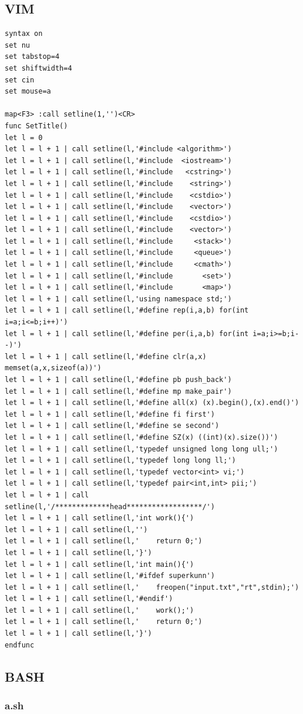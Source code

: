 \documentclass[twoside]{article}
\begin{document}
\subsection{VIM}
\begin{lstlisting}
syntax on
set nu
set tabstop=4
set shiftwidth=4
set cin
set mouse=a

map<F3> :call setline(1,'')<CR>
func SetTitle()
let l = 0
let l = l + 1 | call setline(l,'#include <algorithm>')
let l = l + 1 | call setline(l,'#include  <iostream>')
let l = l + 1 | call setline(l,'#include   <cstring>')
let l = l + 1 | call setline(l,'#include    <string>')
let l = l + 1 | call setline(l,'#include    <cstdio>')
let l = l + 1 | call setline(l,'#include    <vector>')
let l = l + 1 | call setline(l,'#include    <cstdio>')
let l = l + 1 | call setline(l,'#include    <vector>')
let l = l + 1 | call setline(l,'#include     <stack>')
let l = l + 1 | call setline(l,'#include     <queue>')
let l = l + 1 | call setline(l,'#include     <cmath>')
let l = l + 1 | call setline(l,'#include       <set>')
let l = l + 1 | call setline(l,'#include       <map>')
let l = l + 1 | call setline(l,'using namespace std;')
let l = l + 1 | call setline(l,'#define rep(i,a,b) for(int i=a;i<=b;i++)')
let l = l + 1 | call setline(l,'#define per(i,a,b) for(int i=a;i>=b;i--)')
let l = l + 1 | call setline(l,'#define clr(a,x) memset(a,x,sizeof(a))')
let l = l + 1 | call setline(l,'#define pb push_back')
let l = l + 1 | call setline(l,'#define mp make_pair')
let l = l + 1 | call setline(l,'#define all(x) (x).begin(),(x).end()')
let l = l + 1 | call setline(l,'#define fi first')
let l = l + 1 | call setline(l,'#define se second')
let l = l + 1 | call setline(l,'#define SZ(x) ((int)(x).size())')
let l = l + 1 | call setline(l,'typedef unsigned long long ull;')
let l = l + 1 | call setline(l,'typedef long long ll;')
let l = l + 1 | call setline(l,'typedef vector<int> vi;')
let l = l + 1 | call setline(l,'typedef pair<int,int> pii;')
let l = l + 1 | call setline(l,'/*************head******************/')
let l = l + 1 | call setline(l,'int work(){')
let l = l + 1 | call setline(l,'')
let l = l + 1 | call setline(l,'    return 0;')
let l = l + 1 | call setline(l,'}')
let l = l + 1 | call setline(l,'int main(){')
let l = l + 1 | call setline(l,'#ifdef superkunn')
let l = l + 1 | call setline(l,'    freopen("input.txt","rt",stdin);')
let l = l + 1 | call setline(l,'#endif')
let l = l + 1 | call setline(l,'    work();')
let l = l + 1 | call setline(l,'    return 0;')
let l = l + 1 | call setline(l,'}')
endfunc
\end{lstlisting}
\subsection{BASH}
\subsubsection{a.sh}
\end{document}
